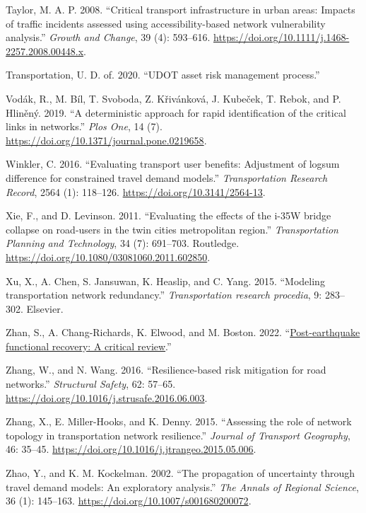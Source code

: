 \documentclass[]{ascelike-new}
\newlength{\cslhangindent}
\newenvironment{CSLReferences}[2] %
 {\begin{list}{}{%
  \setlength{\itemindent}{0pt}
  \setlength{\leftmargin}{0pt}
  \setlength{\parsep}{0pt}
  \ifodd #1
   \setlength{\leftmargin}{\cslhangindent}
   \setlength{\itemindent}{-1\cslhangindent}
  \fi
  \setlength{\itemsep}{#2\baselineskip}}}
 {\end{list}}
\begin{document}
\begin{CSLReferences}{1}{0}
Taylor, M. A. P. 2008. {``Critical transport infrastructure in urban
areas: Impacts of traffic incidents assessed using accessibility-based
network vulnerability analysis.''} \emph{Growth and Change}, 39 (4):
593--616. \url{https://doi.org/10.1111/j.1468-2257.2008.00448.x}.

Transportation, U. D. of. 2020. {``UDOT asset risk management
process.''}

Vodák, R., M. Bíl, T. Svoboda, Z. Křivánková, J. Kubeček, T. Rebok, and
P. Hliněný. 2019. {``A deterministic approach for rapid identification
of the critical links in networks.''} \emph{Plos One}, 14 (7).
\url{https://doi.org/10.1371/journal.pone.0219658}.

Winkler, C. 2016. {``Evaluating transport user benefits: Adjustment of
logsum difference for constrained travel demand models.''}
\emph{Transportation Research Record}, 2564 (1): 118--126.
\url{https://doi.org/10.3141/2564-13}.

Xie, F., and D. Levinson. 2011. {``Evaluating the effects of the i-35W
bridge collapse on road-users in the twin cities metropolitan region.''}
\emph{Transportation Planning and Technology}, 34 (7): 691--703.
Routledge. \url{https://doi.org/10.1080/03081060.2011.602850}.

Xu, X., A. Chen, S. Jansuwan, K. Heaslip, and C. Yang. 2015. {``Modeling
transportation network redundancy.''} \emph{Transportation research
procedia}, 9: 283--302. Elsevier.

Zhan, S., A. Chang-Richards, K. Elwood, and M. Boston. 2022.
{``\href{https://repo.nzsee.org.nz/xmlui/handle/nzsee/2507}{Post-earthquake
functional recovery: A critical review}.''}

Zhang, W., and N. Wang. 2016. {``Resilience-based risk mitigation for
road networks.''} \emph{Structural Safety}, 62: 57--65.
\url{https://doi.org/10.1016/j.strusafe.2016.06.003}.

Zhang, X., E. Miller-Hooks, and K. Denny. 2015. {``Assessing the role of
network topology in transportation network resilience.''} \emph{Journal
of Transport Geography}, 46: 35--45.
\url{https://doi.org/10.1016/j.jtrangeo.2015.05.006}.

Zhao, Y., and K. M. Kockelman. 2002. {``The propagation of uncertainty
through travel demand models: An exploratory analysis.''} \emph{The
Annals of Regional Science}, 36 (1): 145--163.
\url{https://doi.org/10.1007/s001680200072}.


\end{CSLReferences}
\end{document}
